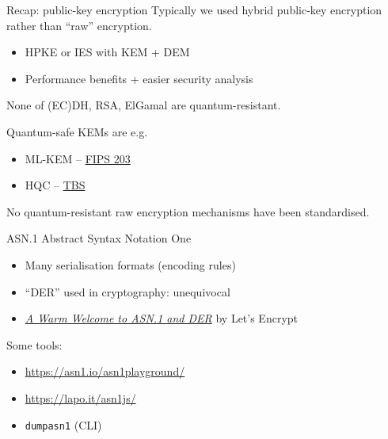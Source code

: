 \begin{frame}{Recap: public-key encryption}
  Typically we used hybrid public-key encryption rather than \enquote{raw} encryption.
  \begin{itemize}[<+(1)->]
    \item HPKE or IES with KEM + DEM
    \item Performance benefits + easier security analysis
  \end{itemize}

  \vspace*{1em}

  \pause
  None of (EC)DH, RSA, ElGamal are quantum-resistant.

  \pause
  Quantum-safe KEMs are e.g.
  \begin{itemize}
    \item ML-KEM -- \href{https://csrc.nist.gov/pubs/fips/203/final}{FIPS 203}
    \item HQC -- \href{https://www.nist.gov/news-events/news/2025/03/nist-selects-hqc-fifth-algorithm-post-quantum-encryption?utm_source=chatgpt.com}{TBS}
  \end{itemize}

  \pause
  No quantum-resistant raw encryption mechanisms have been standardised.
\end{frame}

\begin{frame}{ASN.1}
  Abstract Syntax Notation One
  \begin{itemize}[<+(1)->]
    \item Many serialisation formats (encoding rules)
    \item \enquote{DER} used in cryptography: unequivocal
    \item \href{https://letsencrypt.org/docs/a-warm-welcome-to-asn1-and-der/}{\textit{A Warm Welcome to ASN.1 and DER}} by Let's Encrypt
  \end{itemize}

  \pause
  Some tools:
  \begin{itemize}[<+(1)->]
    \item \url{https://asn1.io/asn1playground/}
    \item \url{https://lapo.it/asn1js/}
    \item \texttt{dumpasn1} (CLI)
  \end{itemize}
\end{frame}

